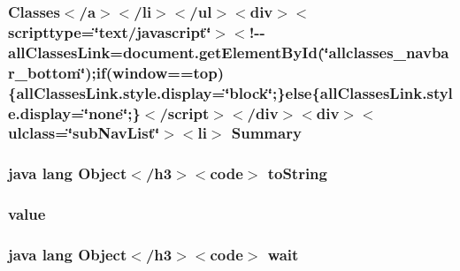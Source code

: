 \hypertarget{_cloudia_d_b_8html_a6f9ab45abc9b0679dc1b132fbacfc681}{
\subsubsection[{Summary}]{\setlength{\rightskip}{0pt plus 5cm}Classes$<$/{\bf a}$>$$<$/li$>$$<$/ul$>$$<$div$>$$<$scripttype=\char`\"{}text/javascript\char`\"{}$>$$<$!-\/-\/all\-Classes\-Link=document.\-get\-Element\-By\-Id(\char`\"{}allclasses\-\_\-navbar\-\_\-bottom\char`\"{});if(window==top)\{all\-Classes\-Link.\-style.\-display=\char`\"{}block\char`\"{};\}else\{all\-Classes\-Link.\-style.\-display=\char`\"{}none\char`\"{};\}$<$/script$>$$<$/div$>$$<$div$>$$<$ulclass=\char`\"{}sub\-Nav\-List\char`\"{}$>$$<$li$>$ Summary}}\label{_cloudia_d_b_8html_a6f9ab45abc9b0679dc1b132fbacfc681}
\hypertarget{_cloudia_d_b_8html_a36e8a76a4132c9a7081416f27d087615}{
\subsubsection[{to\-String}]{\setlength{\rightskip}{0pt plus 5cm}java lang Object$<$/h3$>$$<$code$>$ to\-String}}\label{_cloudia_d_b_8html_a36e8a76a4132c9a7081416f27d087615}
\hypertarget{_cloudia_d_b_8html_afcc7a4b78ecd8fa7e713f8cfa0f51017}{
\subsubsection[{value}]{\setlength{\rightskip}{0pt plus 5cm}value}}\label{_cloudia_d_b_8html_afcc7a4b78ecd8fa7e713f8cfa0f51017}
\hypertarget{_cloudia_d_b_8html_a9a9f0c22e5688d478c707f910f1c1aea}{
\subsubsection[{wait}]{\setlength{\rightskip}{0pt plus 5cm}java lang Object$<$/h3$>$$<$code$>$ wait}}\label{_cloudia_d_b_8html_a9a9f0c22e5688d478c707f910f1c1aea}
